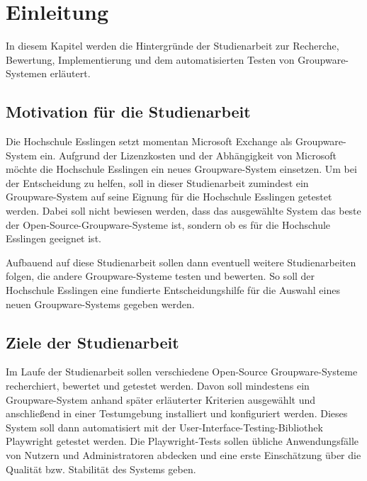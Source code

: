 \chapter{Einleitung}

In diesem Kapitel werden die Hintergründe der Studienarbeit zur Recherche, Bewertung, Implementierung und dem automatisierten Testen von Groupware-Systemen erläutert.

\section{Motivation für die Studienarbeit}

Die Hochschule Esslingen setzt momentan Microsoft Exchange als Groupware-System ein.
Aufgrund der Lizenzkosten und der Abhängigkeit von Microsoft möchte die Hochschule Esslingen ein neues Groupware-System einsetzen.
Um bei der Entscheidung zu helfen, soll in dieser Studienarbeit zumindest ein Groupware-System auf seine Eignung für die Hochschule Esslingen getestet werden.
Dabei soll nicht bewiesen werden, dass das ausgewählte System das beste der Open-Source-Groupware-Systeme ist, sondern ob es für die Hochschule Esslingen geeignet ist.

Aufbauend auf diese Studienarbeit sollen dann eventuell weitere Studienarbeiten folgen, die andere Groupware-Systeme testen und bewerten.
So soll der Hochschule Esslingen eine fundierte Entscheidungshilfe für die Auswahl eines neuen Groupware-Systems gegeben werden.



\section{Ziele der Studienarbeit}

Im Laufe der Studienarbeit sollen verschiedene Open-Source Groupware-Systeme recherchiert, bewertet und getestet werden.
Davon soll mindestens ein Groupware-System anhand später erläuterter Kriterien ausgewählt und anschließend in einer Testumgebung installiert und konfiguriert werden.
Dieses System soll dann automatisiert mit der User-Interface-Testing-Bibliothek Playwright getestet werden.
Die Playwright-Tests sollen übliche Anwendungsfälle von Nutzern und Administratoren abdecken und eine erste Einschätzung über die Qualität bzw. Stabilität des Systems geben.



